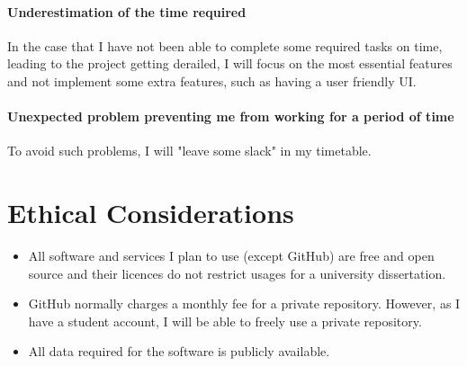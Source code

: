 \documentclass{article}
\begin{document}
	\paragraph{Underestimation of the time required} In the case that I have not been able to complete some required tasks on time, leading to the project getting derailed, I will focus on the most essential features and not implement some extra features, such as having a user friendly UI.
	\paragraph{Unexpected problem preventing me from working for a period of time} To avoid such problems, I will "leave some slack" in my timetable.
	
	\section{Ethical Considerations}
	\begin{itemize}
		\item All software and services I plan to use (except GitHub) are free and open source and their licences do not restrict usages for a university dissertation.
		\item GitHub normally charges a monthly fee for a private repository. However, as I have a student account, I will be able to freely use a private repository.
		\item All data required for the software is publicly available.
	\end{itemize} 
\end{document}
